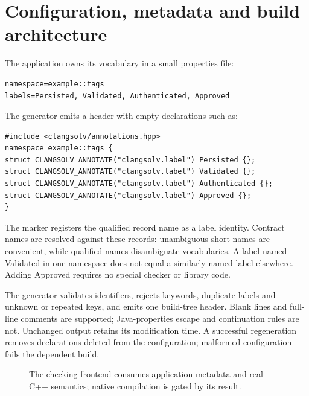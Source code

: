 \documentclass[11pt]{article}
\begin{document}
\section{Configuration, metadata and build architecture}
The application owns its vocabulary in a small properties file:
\begin{lstlisting}[language={}]
namespace=example::tags
labels=Persisted, Validated, Authenticated, Approved
\end{lstlisting}
The generator emits a header with empty declarations such as:
\begin{lstlisting}
#include <clangsolv/annotations.hpp>
namespace example::tags {
struct CLANGSOLV_ANNOTATE("clangsolv.label") Persisted {};
struct CLANGSOLV_ANNOTATE("clangsolv.label") Validated {};
struct CLANGSOLV_ANNOTATE("clangsolv.label") Authenticated {};
struct CLANGSOLV_ANNOTATE("clangsolv.label") Approved {};
}
\end{lstlisting}
The marker registers the qualified record name as a label identity. Contract
names are resolved against these records: unambiguous short names are
convenient, while qualified names disambiguate vocabularies. A label named
Validated in one namespace does not equal a similarly named label elsewhere.
Adding Approved requires no special checker or library code.

The generator validates identifiers, rejects keywords, duplicate labels and
unknown or repeated keys, and emits one build-tree header. Blank lines and
full-line comments are supported; Java-properties escape and continuation
rules are not. Unchanged output retains its modification time. A successful
regeneration removes declarations deleted from the configuration; malformed
configuration fails the dependent build.

\begin{figure}[ht]
\centering
{}
\caption{The checking frontend consumes application metadata and real C++
semantics; native compilation is gated by its result.}
\label{fig:architecture}
\end{figure}
\end{document}
